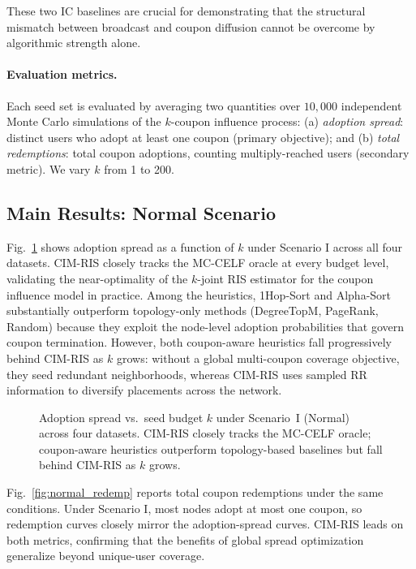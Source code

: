 \documentclass[sigconf]{acmart}
\newcommand{\CIMRIS}{\textsc{CIM-RIS}}
\begin{document}
These two IC baselines are crucial for demonstrating that the
structural mismatch between broadcast and coupon diffusion cannot
be overcome by algorithmic strength alone.

\paragraph{Evaluation metrics.}
Each seed set is evaluated by averaging two quantities over $10{,}000$
independent Monte Carlo simulations of the $k$-coupon influence process:
(a) \emph{adoption spread}: distinct users who adopt at least one
coupon (primary objective); and (b) \emph{total redemptions}: total
coupon adoptions, counting multiply-reached users (secondary metric).
We vary $k$ from 1 to 200.

\subsection{Main Results: Normal Scenario}
\label{sec:exp-normal}

Fig.~\ref{fig:normal_spread} shows adoption spread as a function of $k$
under Scenario I across all four datasets.
\CIMRIS{} closely tracks the MC-CELF oracle at every budget level,
validating the near-optimality of the $k$-joint RIS estimator for the
coupon influence model in practice.
Among the heuristics, 1Hop-Sort and Alpha-Sort substantially outperform
topology-only methods (DegreeTopM, PageRank, Random) because they
exploit the node-level adoption probabilities that govern coupon
termination.
However, both coupon-aware heuristics fall progressively behind
\CIMRIS{} as $k$ grows: without a global multi-coupon coverage objective,
they seed redundant neighborhoods, whereas \CIMRIS{} uses sampled RR
information to diversify placements across the network.

\begin{figure}[t]
  \centering
  \caption{Adoption spread vs.\ seed budget $k$ under Scenario~I
    (Normal) across four datasets.
    \CIMRIS{} closely tracks the MC-CELF oracle;
    coupon-aware heuristics outperform topology-based baselines but
    fall behind \CIMRIS{} as $k$ grows.}
  \label{fig:normal_spread}
\end{figure}

Fig.~\ref{fig:normal_redemp} reports total coupon redemptions under the
same conditions.
Under Scenario I, most nodes adopt at most one coupon, so redemption
curves closely mirror the adoption-spread curves.
\CIMRIS{} leads on both metrics, confirming that the benefits of global
spread optimization generalize beyond unique-user coverage.
\end{document}
